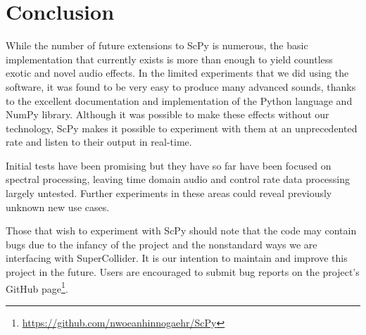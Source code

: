 \documentclass{article}
\begin{document}
\section{Conclusion}

While the number of future extensions to ScPy is numerous, the basic implementation that currently
exists is more than enough to yield countless exotic and novel audio effects. In the limited
experiments that we did using the software, it was found to be very easy to produce many advanced
sounds, thanks to the excellent documentation and implementation of the Python language and NumPy
library. Although it was possible to make these effects without our technology, ScPy makes it
possible to experiment with them at an unprecedented rate and listen to their output in real-time.

Initial tests have been promising but they have so far have been focused on spectral processing,
leaving time domain audio and control rate data processing largely untested. Further experiments in
these areas could reveal previously unknown new use cases.

Those that wish to experiment with ScPy should note that the code may contain bugs due to the
infancy of the project and the nonstandard ways we are interfacing with SuperCollider. It is our
intention to maintain and improve this project in the future. Users are encouraged to submit bug
reports on the project's GitHub page\footnote{\url{https://github.com/nwoeanhinnogaehr/ScPy}}.

\printbibliography{}
\end{document}
